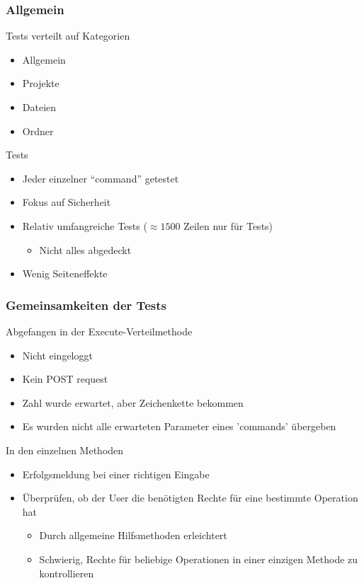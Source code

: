 \documentclass{beamer}
\begin{document}
  \begin{frame}
    \frametitle{Allgemein}
    \begin{block}{Tests verteilt auf Kategorien}
     \begin{itemize}
      \item Allgemein
      \item Projekte  
      \item Dateien 
      \item Ordner
     \end{itemize}

    \end{block}
    
    \begin{block}{Tests}
    \begin{itemize}
     \item Jeder einzelner ``command'' getestet
     \item Fokus auf Sicherheit
     \item Relativ umfangreiche Tests ($\approx1500$ Zeilen nur für Tests)
     \begin{itemize}
      \item Nicht alles abgedeckt
     \end{itemize}
     \item Wenig Seiteneffekte
    \end{itemize}
    \end{block}

  \end{frame}

  
  \begin{frame}
   \frametitle{Gemeinsamkeiten der Tests}
   \begin{block}{Abgefangen in der Execute-Verteilmethode}
    \begin{itemize}
     \item Nicht eingeloggt
     \item Kein POST request
     \item Zahl wurde erwartet, aber Zeichenkette bekommen
     \item Es wurden nicht alle erwarteten Parameter eines 'commands' übergeben
    \end{itemize}
   \end{block}
   \begin{block}{In den einzelnen Methoden}
    \begin{itemize}
     \item Erfolgsmeldung bei einer richtigen Eingabe
     \item Überprüfen, ob der User die benötigten Rechte für eine bestimmte Operation hat
     \begin{itemize}
      \item Durch allgemeine Hilfsmethoden erleichtert
      \item Schwierig, Rechte für beliebige Operationen in einer einzigen Methode zu kontrollieren
     \end{itemize}
    \end{itemize}
   \end{block}
  \end{frame}
  
\end{document}
